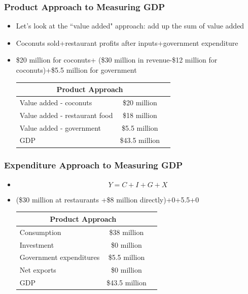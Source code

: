 \documentclass{beamer}
\begin{document}
\begin{frame}
\frametitle[alignment=center]{Product Approach to Measuring GDP}
\begin{itemize}
\item Let's look at the ``value added" approach:  add up the sum of value added
\item Coconuts sold+restaurant profits after inputs+government expenditure
\item \$20 million for coconuts+ (\$30 million in revenue-\$12 million for coconuts)+\$5.5 million for government
\begin{table}
\begin{tabular}{lcc}
\hline\hline
\multicolumn{2}{c}{Product Approach}\\
\hline
Value added - coconuts & \$20 million\\
Value added - restaurant food & \$18 million\\
Value added - government & \$5.5 million\\
\hline
GDP & \$43.5 million\\
\hline\hline
\end{tabular}
\end{table}
\end{itemize}
\end{frame}

\begin{frame}
\frametitle[alignment=center]{Expenditure Approach to Measuring GDP}
\begin{itemize}
\item $$Y=C+I+G+X$$
\item (\$30 million at restaurants +\$8 million directly)+0+5.5+0
\begin{table}
\begin{tabular}{lcc}
\hline\hline
\multicolumn{2}{c}{Product Approach}\\
\hline
Consumption & \$38 million\\
Investment & \$0 million\\
Government expenditures & \$5.5 million\\
Net exports & \$0 million\\
\hline
GDP & \$43.5 million\\
\hline\hline
\end{tabular}
\end{table}
\end{itemize}
\end{frame}
\end{document}
